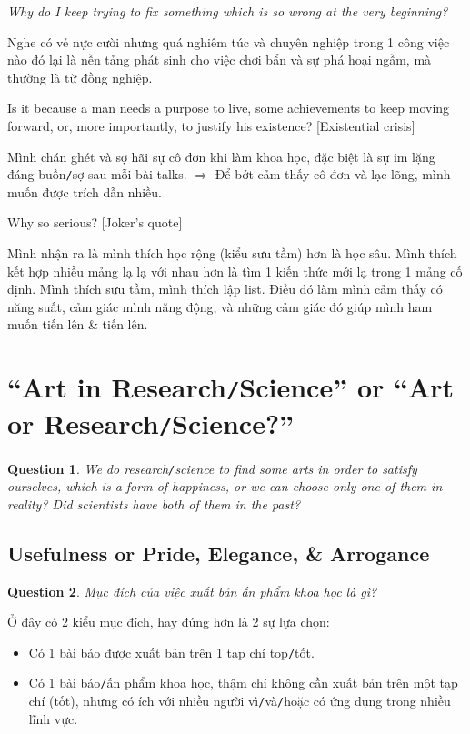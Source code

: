 \documentclass{article}
\numberwithin{equation}{section}
\newtheorem{ques}{Question}[section]
\begin{document}
\textit{Why do I keep trying to fix something which is so wrong at the very beginning?}

Nghe có vẻ nực cười nhưng quá nghiêm túc và chuyên nghiệp trong 1 công việc nào đó lại là nền tảng phát sinh cho việc chơi bẩn và sự phá hoại ngầm, mà thường là từ đồng nghiệp.

Is it because a man needs a purpose to live, some achievements to keep moving forward, or, more importantly, to justify his existence? [Existential crisis]

Mình chán ghét và sợ hãi sự cô đơn khi làm khoa học, đặc biệt là sự im lặng đáng buồn\texttt{/}sợ sau mỗi bài talks. $\Rightarrow$ Để bớt cảm thấy cô đơn và lạc lõng, mình muốn được trích dẫn nhiều.

Why so serious? [Joker's quote]

Mình nhận ra là mình thích học rộng (kiểu sưu tầm) hơn là học sâu. Mình thích kết hợp nhiều mảng lạ lạ với nhau hơn là tìm 1 kiến thức mới lạ trong 1 mảng cố định. Mình thích sưu tầm, mình thích lập list. Điều đó làm mình cảm thấy có năng suất, cảm giác mình năng động, và những cảm giác đó giúp mình ham muốn tiến lên \& tiến lên.


\section{``Art in Research\texttt{/}Science'' or ``Art or Research\texttt{/}Science?''}
\begin{ques}
	We do research\texttt{/}science to find some arts in order to satisfy ourselves, which is a form of happiness, or we can choose only one of them in reality? Did scientists have both of them in the past?
\end{ques}

\subsection{Usefulness or Pride, Elegance, \& Arrogance}
\begin{ques}
	Mục đích của việc xuất bản ấn phẩm khoa học là gì?
\end{ques}
Ở đây có 2 kiểu mục đích, hay đúng hơn là 2 sự lựa chọn:
\begin{itemize}
	\item Có 1 bài báo được xuất bản trên 1 tạp chí top\texttt{/}tốt.
	\item Có 1 bài báo\texttt{/}ấn phẩm khoa học, thậm chí không cần xuất bản trên một tạp chí (tốt), nhưng có ích với nhiều người vì\texttt{/}và\texttt{/}hoặc có ứng dụng trong nhiều lĩnh vực.
\end{itemize}
\end{document}
